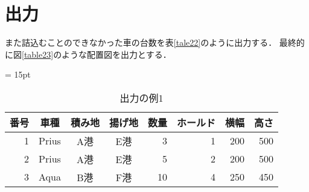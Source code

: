 \section{出力}
また詰込むことのできなかった車の台数を表\ref{tale22}のように出力する．
最終的に図\ref{table23}のような配置図を出力とする．

\begin{table}[htbp]
    \tabcolsep = 15pt
    \renewcommand{\arraystretch}{0.8}
    \caption{出力の例1}
    \label{table22}
    \begin{center}
    \begin{tabular}{rcccrrrr} \hline
    番号 & 車種 & 積み地 & 揚げ地 & 数量 & ホールド & 横幅 & 高さ \\ \hline
    1 & Prius & A港 & E港 & 3 & 1 & 200 & 500 \\
    2 & Prius & A港 & E港 & 5 & 2 & 200 & 500 \\
    3 & Aqua & B港 & F港 & 10 & 4 & 250 & 450 \\
    \hline
    \end{tabular}
    \end{center}
    \end{table}
